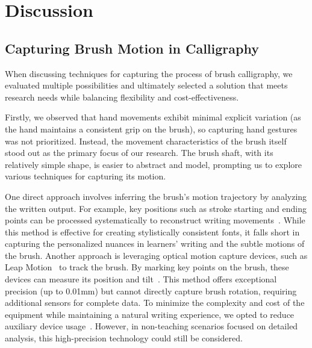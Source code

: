 \section{Discussion}

\subsection{Capturing Brush Motion in Calligraphy}
When discussing techniques for capturing the process of brush calligraphy, we evaluated multiple possibilities and ultimately selected a solution that meets research needs while balancing flexibility and cost-effectiveness.

Firstly, we observed that hand movements exhibit minimal explicit variation (as the hand maintains a consistent grip on the brush), so capturing hand gestures was not prioritized. Instead, the movement characteristics of the brush itself stood out as the primary focus of our research. The brush shaft, with its relatively simple shape, is easier to abstract and model, prompting us to explore various techniques for capturing its motion.

One direct approach involves inferring the brush’s motion trajectory by analyzing the written output. For example, key positions such as stroke starting and ending points can be processed systematically to reconstruct writing movements~\cite{10.1145/3526114.3558657, 10.1145/3613904.3642792}. While this method is effective for creating stylistically consistent fonts, it falls short in capturing the personalized nuances in learners’ writing and the subtle motions of the brush. Another approach is leveraging optical motion capture devices, such as Leap Motion~\cite{weichert2013analysis} to track the brush. By marking key points on the brush, these devices can measure its position and tilt~\cite{Matsumaru_2017jaciii, 10.1145/3029798.3038422}. This method offers exceptional precision (up to 0.01mm) but cannot directly capture brush rotation, requiring additional sensors for complete data. To minimize the complexity and cost of the equipment while maintaining a natural writing experience, we opted to reduce auxiliary device usage~\cite{chang2007simplicity, mcinnerney2004online}. However, in non-teaching scenarios focused on detailed analysis, this high-precision technology could still be considered.

